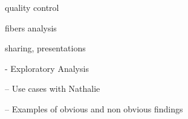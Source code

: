quality control

fibers analysis

sharing, presentations

 - Exploratory Analysis

 -- Use cases with Nathalie

 -- Examples of obvious and non obvious findings


%

